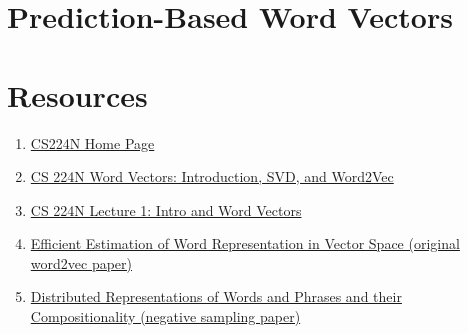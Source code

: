 \documentclass[12pt]{article}
\begin{document}
\section{Prediction-Based Word Vectors}

\section{Resources}
\begin{enumerate}
    \item \href{https://web.stanford.edu/class/cs224n/index.html#schedule}{CS224N Home Page}
    \item \href{https://web.stanford.edu/class/cs224n/readings/cs224n-2019-notes01-wordvecs1.pdf}
    {CS 224N Word Vectors: Introduction, SVD, and Word2Vec}
    \item \href{https://www.youtube.com/watch?v=rmVRLeJRkl4}{CS 224N Lecture 1: Intro and Word Vectors}
    \item \href{https://arxiv.org/pdf/1301.3781.pdf}
    {Efficient Estimation of Word Representation in Vector Space (original word2vec paper)}
    \item \href{https://proceedings.neurips.cc/paper/2013/file/9aa42b31882ec039965f3c4923ce901b-Paper.pdf}
    {Distributed Representations of Words and Phrases and their Compositionality (negative sampling paper)}
\end{enumerate}
\end{document}
